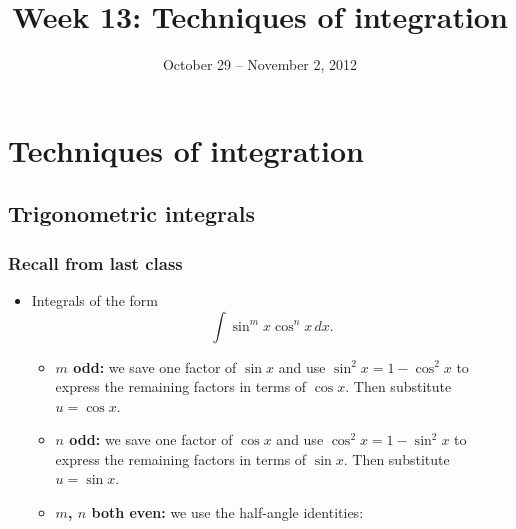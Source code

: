 \documentclass[t]{beamer}
\title{Week 13:  Techniques of integration}
\date{October 29 -- November 2, 2012}
\theoremstyle{plain}
\theoremstyle{definition}
\newcommand{\ds}{\displaystyle}
\begin{document}
\frame{\titlepage}

\setcounter{tocdepth}{2}


\section{Techniques of integration}
\subsection{Trigonometric integrals}

\begin{frame}
\frametitle{Recall from last class}
\begin{itemize}[<+->]
\item Integrals of the form \[ \ds\int \sin^mx \cos^nx\,dx.\]
\begin{itemize}[<+->]
\item \textbf{$m$ odd:} we save one factor of $\sin x$ and use $\sin^2x=1-\cos^2x$ to express the remaining factors in terms of $\cos x$. Then substitute $u=\cos x$.
\item \textbf{$n$ odd:} we save one factor of $\cos x$ and use $\cos^2x=1-\sin^2x$ to express the remaining factors in terms of $\sin x$. Then substitute $u=\sin x$.
\item \textbf{$m$, $n$ both even:} we use the half-angle identities:
\end{itemize}
\end{itemize}
\end{frame}
\end{document}
